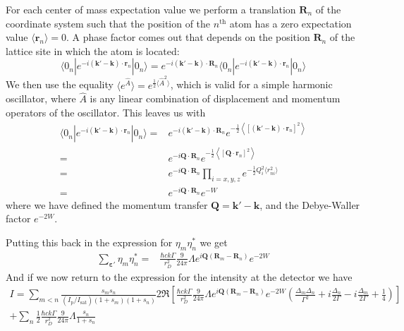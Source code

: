 \documentclass[11pt,letter]{article}
\newcommand{\bv}[1]{\ensuremath{\bm{#1}}}
\begin{document}
For each center of mass expectation value we perform a translation $\bv{R}_{n}$
of the coordinate system such that the position of the $n^{\text{th}}$ atom has
a zero expectation value $\langle \bv{r}_{n} \rangle = 0$.  A phase factor
comes out that depends on the position $\bv{R}_{n}$ of the lattice site in
which the atom is located:
\begin{equation}
      \langle 0_{n} | e^{-i(\bv{k}'-\bv{k}) \cdot\bv{r}_{n}} | 0_{n}  \rangle 
    = e^{-i(\bv{k}'-\bv{k}) \cdot\bv{R}_{n}} 
      \langle 0_{n} | e^{-i(\bv{k}'-\bv{k}) \cdot\bv{r}_{n}} | 0_{n}  \rangle
\end{equation} 
We then use the equality $\langle e^{\hat{A}} \rangle = e^{\frac{1}{2} \langle
\hat{A}^{2} \rangle }$, which is valid for a simple harmonic oscillator, where
$\hat{A}$ is any linear combination of displacement and momentum operators of
the oscillator.  This leaves us with
\begin{equation}
\begin{split}
      \langle 0_{n} | e^{-i(\bv{k}'-\bv{k}) \cdot\bv{r}_{n}} | 0_{n}  \rangle 
    = & e^{-i(\bv{k}'-\bv{k}) \cdot\bv{R}_{n}} 
      e^{ -\frac{1}{2} \left\langle 
          [ (\bv{k}'-\bv{k}) \cdot\bv{r}_{n} ]^{2} \right\rangle } \\
    = & e^{ -i \bv{Q} \cdot \bv{R}_{n}} 
      e^{ -\frac{1}{2} \left\langle [ \bv{Q} \cdot\bv{r}_{n} ]^{2} \right\rangle } \\ 
    = & e^{ -i \bv{Q} \cdot \bv{R}_{n}}
      \prod_{i=x,y,z} e^{ - \frac{1}{2}Q_{i}^{2}\langle r_{ni} ^{2} \rangle } \\ 
    = & e^{ -i \bv{Q} \cdot \bv{R}_{n}}
      e^{-W} 
\end{split}
\end{equation} 
where we have defined the momentum transfer $\bv{Q} = \bv{k}' - \bv{k}$,  and
the Debye-Waller factor $e^{-2W}$. 

Putting this back in the expression for $\eta_{m}\eta_{n}^{*}$ we get
\begin{equation}
\begin{split}
 \sum_{\bv{\varepsilon}' } \eta_{m}\eta_{n}^{*} = & 
 \frac{\hbar c k \Gamma}{r_{D}^{2}}  
    \frac{9}{24\pi} \Lambda
       e^{ i \bv{Q}( \bv{R}_{m} - \bv{R}_{n} ) } e^{-2W} 
\end{split}
\end{equation}
And if we now return to the expression for the intensity at the detector we
have 
\begin{multline}
 I  = 
  \sum_{m<n} 
    \frac{ s_{m} s_{n} } 
         { (I_{\mathrm{p}}/I_{\mathrm{sat}}) ( 1+s_{m} )( 1+s_{n} ) }
    2 \Re\left[ 
            \frac{\hbar c k \Gamma}{r_{D}^{2}}  
            \frac{9}{24\pi}  \Lambda
               e^{ i \bv{Q}( \bv{R}_{m} - \bv{R}_{n} ) } e^{-2W}  
    \left(
        \frac{ \Delta_{m} \Delta_{n} }{ \Gamma^{2} } 
      + i \frac{ \Delta_{n} }{ 2 \Gamma } 
      - i \frac{ \Delta_{m} }{ 2 \Gamma } 
      + \frac{1}{4}  
    \right) \right] \\ 
  + \sum_{n}  \frac{1}{2}
    \frac{\hbar c k \Gamma}{r_{D}^{2}}  
    \frac{9}{24\pi} \Lambda
    \frac{ s_{n} } { 1 + s_{n} } 
\end{multline}
\end{document}
